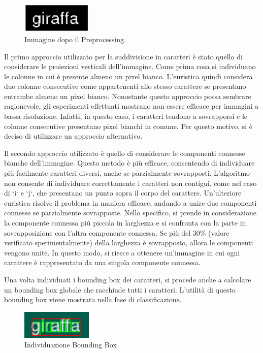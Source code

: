 \begin{figure}[H]
	\centering
	\includegraphics[width=0.3\textwidth]{images/giraffa-bin.png}
	\caption{Immagine dopo il Preprocessing.}
	\label{fig:giraffabin}
\end{figure}

Il primo approccio utilizzato per la suddivisione in caratteri è stato quello di considerare le proiezioni verticali dell'immagine. Come prima cosa si individuano le colonne in cui è presente almeno un pixel bianco.
L'euristica quindi considera due colonne consecutive come appartenenti allo stesso carattere se presentano entrambe almeno un pixel bianco. Nonostante questo approccio possa sembrare ragionevole, gli esperimenti effettuati mostrano non essere efficace per immagini a bassa risoluzione. Infatti, in questo caso, i caratteri tendono a sovrapporsi e le colonne consecutive presentano pixel bianchi in comune. Per questo motivo, si è deciso di utilizzare un approccio alternativo.
\newline

Il secondo approccio utilizzato è quello di considerare le componenti connesse bianche dell'immagine. Questo metodo è più efficace, consentendo di individuare più facilmente caratteri diversi, anche se parzialmente sovrapposti. L'algoritmo non consente di individuare correttamente i caratteri non contigui, come nel caso di `i` e `j`, che presentano un punto sopra il corpo del carattere. Un'ulteriore euristica risolve il problema in maniera efficace, andando a unire due componenti connesse se parzialmente sovrapposte. Nello specifico, si prende in considerazione la componente connessa più piccola in larghezza e si confronta con la parte in sovrapposizione con l'altra componente connessa. Se più del 30\% (valore verificato sperimentalmente) della larghezza è sovrapposto, allora le componenti vengono unite. In questo modo, si riesce a ottenere un'immagine in cui ogni carattere è rappresentato da una singola componente connessa.
\newline

Una volta individuati i bounding box dei caratteri, si procede anche a calcolare un bounding box globale che racchiude tutti i caratteri. L'utilità di questo bounding box viene mostrata nella fase di classificazione.

\begin{figure}[H]
	\centering
	\includegraphics[width=0.3\textwidth]{images/giraffa-bb.jpeg}
	\caption{Individuazione Bounding Box}
	\label{fig:screenshot}
\end{figure}

